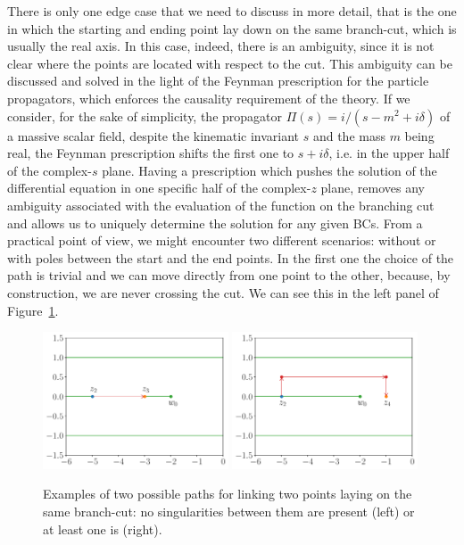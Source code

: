 There is only one edge case that we need to discuss in more detail, that is the one in which the starting and ending point lay down on the same branch-cut, which is usually the real axis. In this case, indeed, there is an ambiguity, since it is not clear where the points are located with respect to the cut. This ambiguity can be discussed and solved in the light of the Feynman prescription for the particle propagators, which enforces the causality requirement of the theory.
If we consider, for the sake of simplicity, the propagator $\Pi(s)=i/(s-m^2+i\delta)$ of a massive scalar field, despite the kinematic invariant $s$ and the mass $m$ being real, the Feynman prescription shifts the first one to $s+i\delta$, i.e. in the upper half of the complex-$s$ plane.
Having a prescription which pushes the solution of the differential equation in one specific half of the complex-$z$ plane, removes any ambiguity associated with the evaluation of the function on the branching cut and allows us to uniquely determine the solution for any given BCs.
From a practical point of view, we might encounter two different scenarios: without or with poles between the start and the end points. In the first one the choice of the path is trivial and we can move directly from one point to the other, because, by construction, we are never crossing the cut. We can see this in the left panel of Figure~\ref{fig:realAxis}. 
\begin{figure}[t]
\includegraphics[width=0.49\textwidth]{paperSeaFire/Images/path_realaxis.pdf}
\includegraphics[width=0.49\textwidth]{paperSeaFire/Images/path_realaxis2.pdf}
\caption{\label{fig:realAxis}
Examples of two possible paths for linking two points laying on the same branch-cut: no singularities between them are present (left) or at least one is (right).}
\end{figure}
